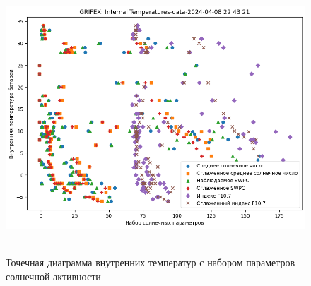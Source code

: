 \documentclass[14pt, a4paper]{../cls/coursework}
\begin{document}
    \begin{figure}[!htbp]
        \centering
        \includegraphics[width=1.0\textwidth]{grifex_battery_vs_solar}
        ~\caption{Точечная диаграмма внутренних температур с набором параметров солнечной активности}
        \label{fig:grifex_battery_vs_solar}
    \end{figure}
\end{document}
